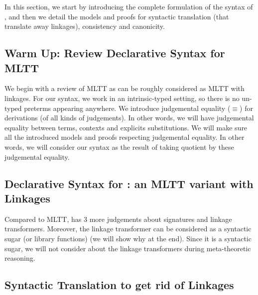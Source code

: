 In this section, we start by introducing the complete formulation of the syntax of \TT, 
and then we detail the models and proofs for syntactic translation (that translate away linkages), 
consistency and canonicity. 

\subsection{Warm Up: Review Declarative Syntax for MLTT}
We begin with a review of MLTT as \TT can be roughly considered as MLTT with linkages.
For our syntax, we work in an intrinsic-typed setting, so there is no un-typed preterms appearing anywhere. We introduce judgemental equality ($\equiv$)
for derivations (of all kinds of judgements). In other words, we will have judgemental equality between terms, 
contexts and explicits substitutions. 
We will make sure all the introduced models and proofs respecting judgemental equality. In other words, we will consider our syntax as the result of taking quotient by these judgemental equality.



\subsection{Declarative Syntax for \TT : an MLTT variant with Linkages}
Compared to MLTT, \TT has 3 more judgements about signatures and linkage transformers. Moreover, the linkage transformer can be considered as a syntactic sugar (or library functions) (we will show why at the end). 
Since it is a syntactic sugar, we will not consider about the linkage transformers during meta-theoretic reasoning.









\subsection{Syntactic Translation to get rid of Linkages}




